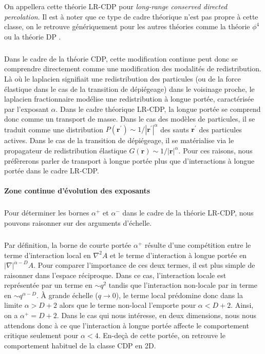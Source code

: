\noindent On appellera cette théorie LR-CDP pour \textit{long-range conserved directed percolation}. Il est à noter que ce type de cadre théorique n'est pas propre à cette classe, on le retrouve génériquement pour les autres théories comme la théorie $\phi^4$ ou la théorie DP \cite{fisher_critical_1972, hinrichsen_non_equilibrium_2007}.

\subparagraph{}Dans le cadre de la théorie CDP, cette modification continue peut donc se comprendre directement comme une modification des modalités de redistribution. Là où le laplacien signifiait une redistribution des particules (ou de la force élastique dans le cas de la transition de dépiégeage) dans le voisinage proche, le laplacien fractionnaire modélise une redistribution à longue portée, caractérisée par l'exposant $\alpha$. Dans le cadre théorique LR-CDP, la longue portée se comprend donc comme un transport de masse. Dans le cas des modèles de particules, il se traduit comme une distribution $P(\mathbf{r}^\prime)\sim 1/|\mathbf{r}^{\prime}|^{\alpha}$ des sauts $\mathbf{r}^{\prime}$ des particules actives. Dans le cas de la transition de dépiégeage, il se matérialise via le propagateur de redistribution élastique $G(\mathbf{r})\sim 1/|\mathbf{r}|^\alpha$. Pour ces raisons, nous préfèrerons parler de transport à longue portée plus que d'interactions à longue portée dans le cadre LR-CDP.

\paragraph{Zone continue d'évolution des exposants}

\subparagraph{}Pour déterminer les bornes $\alpha^+$ et $\alpha^-$ dans le cadre de la théorie LR-CDP, nous pouvons raisonner sur des arguments d'échelle.

\subparagraph{}Par définition, la borne de courte portée $\alpha^+$ résulte d'une compétition entre le terme d'interaction local en $\nabla^2 A$ et le terme d'interaction à longue portée en $|\nabla|^{\alpha-D} A$. Pour comparer l'importance de ces deux termes, il est plus simple de raisonner dans l'espace réciproque. Dans ce cas, l'interaction locale est représentée par un terme en $\sim q^2$ tandis que l'interaction non-locale par in terme en $\sim q^{\alpha-D}$. \`A grande échelle ($q \rightarrow 0$), le terme local prédomine donc dans la limite $\alpha > D+2$ alors que le terme non-local l'emporte pour $\alpha < D+2$. Ainsi, on a $\alpha^+ = D+2$. Dans le cas qui nous intéresse, en deux dimensions, nous nous attendons donc à ce que l'interaction à longue portée affecte le comportement critique seulement pour $\alpha < 4$. En-deçà de cette portée, on retrouve le comportement habituel de la classe CDP en 2D.


